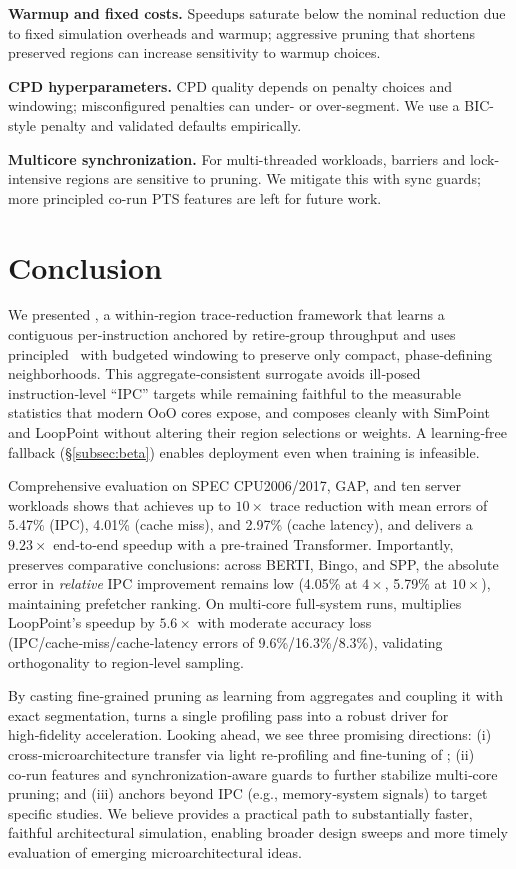 \textbf{Warmup and fixed costs.} Speedups saturate below the nominal reduction due to fixed simulation overheads and warmup; aggressive pruning that shortens preserved regions can increase sensitivity to warmup choices.

\textbf{CPD hyperparameters.} CPD quality depends on penalty choices and windowing; misconfigured penalties can under- or over-segment. We use a BIC-style penalty and validated defaults empirically.

\textbf{Multicore synchronization.} For multi-threaded workloads, barriers and lock-intensive regions are sensitive to pruning. We mitigate this with sync guards; more principled co-run PTS features are left for future work.

\section{Conclusion} \label{summary}
We presented \name, a within‑region trace‑reduction framework that learns a contiguous per‑instruction \pts anchored by retire‑group throughput and uses principled \cpd\ with budgeted windowing to preserve only compact, phase‑defining neighborhoods. This aggregate‑consistent surrogate avoids ill‑posed instruction‑level “IPC” targets while remaining faithful to the measurable statistics that modern OoO cores expose, and composes cleanly with SimPoint and LoopPoint without altering their region selections or weights. A learning‑free fallback (\S\ref{subsec:beta}) enables deployment even when training is infeasible.

Comprehensive evaluation on SPEC CPU2006/2017, GAP, and ten server workloads shows that \name achieves up to $10{\times}$ trace reduction with mean errors of 5.47\% (IPC), 4.01\% (cache miss), and 2.97\% (cache latency), and delivers a $9.23{\times}$ end‑to‑end speedup with a pre‑trained Transformer. Importantly, \name preserves comparative conclusions: across BERTI, Bingo, and SPP, the absolute error in \emph{relative} IPC improvement remains low (4.05\% at $4{\times}$, 5.79\% at $10{\times}$), maintaining prefetcher ranking. On multi‑core full‑system runs, \name multiplies LoopPoint’s speedup by $5.6{\times}$ with moderate accuracy loss (IPC/cache‑miss/cache‑latency errors of 9.6\%/16.3\%/8.3\%), validating orthogonality to region‑level sampling.

By casting fine‑grained pruning as learning from aggregates and coupling it with exact segmentation, \name turns a single profiling pass into a robust driver for high‑fidelity acceleration. Looking ahead, we see three promising directions: (i) cross‑microarchitecture transfer via light re‑profiling and fine‑tuning of \pts; (ii) co‑run \pts features and synchronization‑aware guards to further stabilize multi‑core pruning; and (iii) anchors beyond IPC (e.g., memory‑system signals) to target specific studies. We believe \name provides a practical path to substantially faster, faithful architectural simulation, enabling broader design sweeps and more timely evaluation of emerging microarchitectural ideas.




